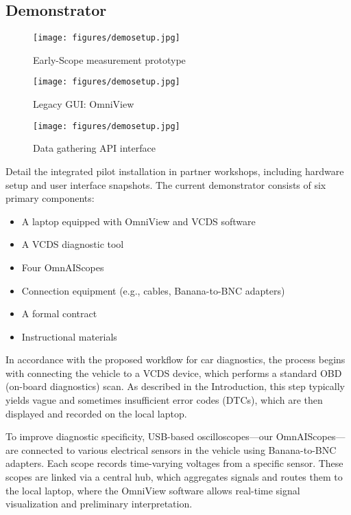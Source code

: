 \subsection{Demonstrator}
\begin{figure}[ht]
  \centering
  \texttt{[image: figures/demosetup.jpg]}
  \caption{Early-Scope measurement prototype}
  \label{fig:early-scope}
\end{figure}

\begin{figure}[ht]
  \centering
  \texttt{[image: figures/demosetup.jpg]}
  \caption{Legacy GUI: OmniView}
  \label{fig:gui}
\end{figure}

\begin{figure}[ht]
  \centering
  \texttt{[image: figures/demosetup.jpg]}
  \caption{Data gathering API interface}
  \label{fig:data-api}
\end{figure}
Detail the integrated pilot installation in partner workshops, including hardware setup and user interface snapshots.
The current demonstrator consists of six primary components:
\begin{itemize}
  \item A laptop equipped with OmniView and VCDS software
  \item A VCDS diagnostic tool
  \item Four OmnAIScopes
  \item Connection equipment (e.g., cables, Banana-to-BNC adapters)
  \item A formal contract
  \item Instructional materials
\end{itemize}
In accordance with the proposed workflow for car diagnostics, the process begins with connecting the vehicle to a VCDS device, which performs a standard OBD (on-board diagnostics) scan. 
As described in the Introduction, this step typically yields vague and sometimes insufficient error codes (DTCs), which are then displayed and recorded on the local laptop.

To improve diagnostic specificity, USB-based oscilloscopes—our OmnAIScopes—are connected to various electrical sensors in the vehicle using Banana-to-BNC adapters. 
Each scope records time-varying voltages from a specific sensor. 
These scopes are linked via a central hub, which aggregates signals and routes them to the local laptop, where the OmniView software allows real-time signal visualization and preliminary interpretation.

